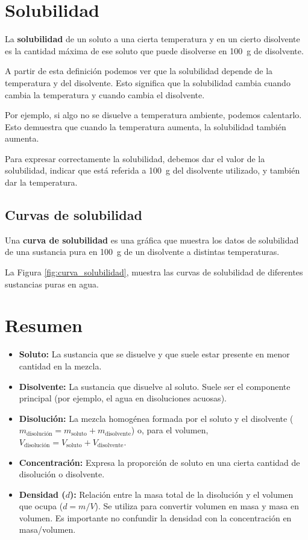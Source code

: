 \section{Solubilidad}

\begin{definition}[Solubilidad]
        La \textbf{solubilidad} de un soluto a una cierta temperatura y en un cierto disolvente es la cantidad máxima de ese soluto que puede disolverse en \qty{100}{\g} de disolvente.
\end{definition}

A partir de esta definición podemos ver que la solubilidad depende de la temperatura y del disolvente.
Esto significa que la solubilidad cambia cuando cambia la temperatura y cuando cambia el disolvente.

Por ejemplo, si algo no se disuelve a temperatura ambiente, podemos calentarlo.
Esto demuestra que cuando la temperatura aumenta, la solubilidad también aumenta.

Para expresar correctamente la solubilidad, debemos dar el valor de la solubilidad, indicar que está referida a \qty{100}{\g} del disolvente utilizado, y también dar la temperatura.

\subsection{Curvas de solubilidad}\label{subsec:curvas-de-solubilidad}

Una \textbf{curva de solubilidad} es una gráfica que muestra los datos de solubilidad de una sustancia pura en \qty{100}{\g} de un disolvente a distintas temperaturas.

La Figura \ref{fig:curva_solubilidad}, muestra las curvas de solubilidad de diferentes sustancias puras en agua.

\section*{Resumen}
\begin{itemize}
    \item \textbf{Soluto:} La sustancia que se disuelve y que suele estar presente en menor cantidad en la mezcla.
    \item \textbf{Disolvente:} La sustancia que disuelve al soluto. Suele ser el componente principal (por ejemplo, el agua en disoluciones acuosas).
    \item \textbf{Disolución:} La mezcla homogénea formada por el soluto y el disolvente ($m_{\text{disolución}} = m_{\text{soluto}} + m_{\text{disolvente}}$) o, para el volumen, \( V_{\text{disolución}} = V_{\text{soluto}} + V_{\text{disolvente}} \).
    \item \textbf{Concentración:} Expresa la proporción de soluto en una cierta cantidad de disolución o disolvente.
    \item \textbf{Densidad ($d$):} Relación entre la masa total de la disolución y el volumen que ocupa ($d = m/V$). Se utiliza para convertir volumen en masa y masa en volumen. Es importante no confundir la densidad con la concentración en masa/volumen.
\end{itemize}

